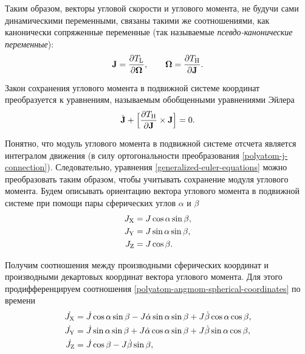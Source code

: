 Таким образом, векторы угловой скорости и углового момента, не будучи сами динамическими переменными, связаны такими же соотношениями, как канонически сопряженные переменные (так называемые \textit{псевдо-канонические переменные}):
\begin{gather}
    \mathbf{J} = \frac{\partial T_\text{L}}{\partial \boldsymbol{\Omega}}, \qquad \boldsymbol{\Omega} = \frac{\partial T_\text{H}}{\partial \mathbf{J}}.
\end{gather}

Закон сохранения углового момента в подвижной системе координат преобразуется к уравнениям, называемым обобщенными уравнениями Эйлера \cite{petrov2015}
\begin{gather}
    \dot{\mathbf{J}} + \Big[ \frac{\partial T_\text{H}}{\partial \mathbf{J}} \times \mathbf{J} \Big] = 0. \label{generalized-euler-equations}
\end{gather}

Понятно, что модуль углового момента в подвижной системе отсчета является интегралом движения (в силу ортогональности преобразования \eqref{polyatom-j-connection}). Следовательно, уравнения \eqref{generalized-euler-equations} можно преобразовать таким образом, чтобы учитывать сохранение модуля углового момента. Будем описывать ориентацию вектора углового момента в подвижной системе при помощи пары сферических углов $\alpha$ и $\beta$
\begin{gather}
    \begin{aligned}
        J_\text{X} &= J \cos \alpha \sin \beta, \\
        J_\text{Y} &= J \sin \alpha \sin \beta, \\
        J_\text{Z} &= J \cos \beta.
    \end{aligned} \label{polyatom-angmom-spherical-coordinates}
\end{gather}

Получим соотношения между производными сферических координат и производными декартовых координат вектора углового момента. Для этого продифференцируем соотношения \eqref{polyatom-angmom-spherical-coordinates} по времени 
\begin{gather}
    \begin{aligned}
        \dot{J_\text{X}} &= \dot{J} \cos \alpha \sin \beta - J \dot{\alpha} \sin \alpha \sin \beta + J \dot{\beta} \cos \alpha \cos \beta, \\
        \dot{J_\text{Y}} &= \dot{J} \sin \alpha \sin \beta + J \dot{\alpha} \cos \alpha \sin \beta + J \dot{\beta} \sin \alpha \cos \beta, \\
        \dot{J_\text{Z}} &= \dot{J} \cos \beta - J \dot{\beta} \sin \beta,
    \end{aligned}
\end{gather}

